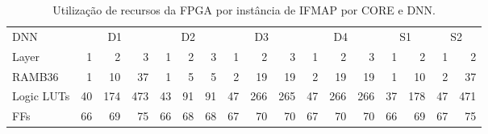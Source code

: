\begin{table}[ht!]
\centering
\caption{Utilização de recursos da FPGA por instância de IFMAP por CORE e DNN.}
\label{tab:5-vivado-iwght}
\begin{tabular}{lrrrrrrrrrrrrrrrr}
\toprule
DNN & \multicolumn{3}{c}{D1} & \multicolumn{3}{c}{D2} & \multicolumn{3}{c}{D3} & \multicolumn{3}{c}{D4} & \multicolumn{2}{c}{S1} & \multicolumn{2}{c}{S2} \\
\cmidrule(lr){2-4} \cmidrule(lr){5-7} \cmidrule(lr){8-10} \cmidrule(lr){11-13} \cmidrule(lr){14-15} \cmidrule(l){16-17}
Layer & 1 & 2 & 3 & 1 & 2 & 3 & 1 & 2 & 3 & 1 & 2 & 3 & 1 & 2 & 1 & 2 \\
\midrule
RAMB36 &      1 &     10 &     37 &      1 &      5 &      5 &      2 &     19 &     19 &      2 &     19 &     19 &      1 &     10 &      2 &     37 \\
Logic LUTs &         40 &        174 &        473 &         43 &         91 &         91 &         47 &        266 &        265 &         47 &        266 &        266 &         37 &        178 &         47 &        471 \\
FFs &   66 &   69 &   75 &   66 &   68 &   68 &   67 &   70 &   70 &   67 &   70 &   70 &   66 &   69 &   67 &   75 \\
\bottomrule
\end{tabular}
\end{table}